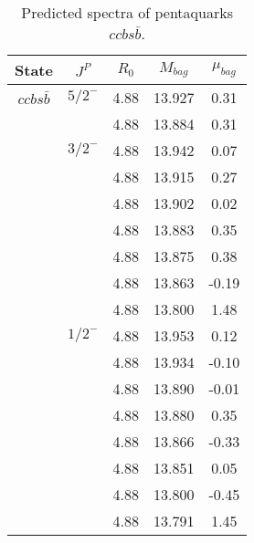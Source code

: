 \documentclass[prd,twocolumn,floatfix,nofootinbib]{revtex4}
\begin{document}
\renewcommand{\tabcolsep}{0.5cm}
\renewcommand{\arraystretch}{1.2}
\begin{table*}[!htbp]
    \caption{Predicted spectra of pentaquarks $ccbs\bar{b}$.}
    \begin{tabular}{ccccc}
        \hline\hline
        {\rm State} &$J^{P}$ &$R_{0}$ &$M_{bag}$ &$\mu_{bag}$ \\ \hline
        ${ccbs\bar{b}}$
            &${5/2}^{-}$    &4.88   &13.927 &0.31 \\
            &               &4.88   &13.884 &0.31 \\
            &${3/2}^{-}$    &4.88   &13.942 &0.07 \\
            &               &4.88   &13.915 &0.27 \\
            &               &4.88   &13.902 &0.02 \\
            &               &4.88   &13.883 &0.35 \\
            &               &4.88   &13.875 &0.38 \\
            &               &4.88   &13.863 &-0.19 \\
            &               &4.88   &13.800 &1.48 \\
            &${1/2}^{-}$    &4.88   &13.953 &0.12 \\
            &               &4.88   &13.934 &-0.10 \\
            &               &4.88   &13.890 &-0.01 \\
            &               &4.88   &13.880 &0.35 \\
            &               &4.88   &13.866 &-0.33 \\
            &               &4.88   &13.851 &0.05 \\
            &               &4.88   &13.800 &-0.45 \\
            &               &4.88   &13.791 &1.45 \\
        \hline\hline 
    \end{tabular}
\end{table*}
\end{document}
